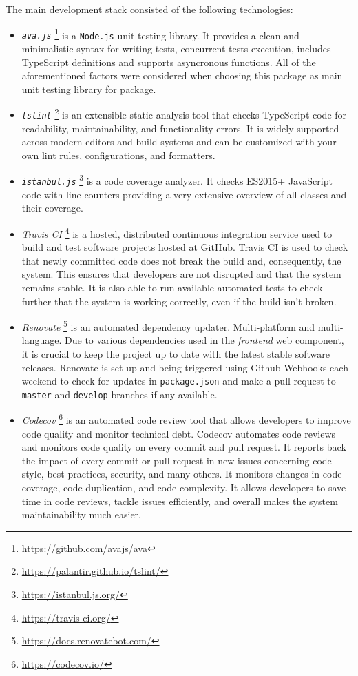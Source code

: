 The main development stack consisted of the following technologies: 
\begin{itemize}
    \item \textit{\texttt{ava.js}} \footnote{\url{https://github.com/avajs/ava}} is a \texttt{Node.js} unit testing library. It provides a clean and minimalistic syntax for writing tests, concurrent tests execution, includes TypeScript definitions and supports asyncronous functions. All of the aforementioned factors were considered when choosing this package as main unit testing library for \lpas{} package.
    
    \item \textit{\texttt{tslint}} \footnote{\url{https://palantir.github.io/tslint/}} is an extensible static analysis tool that checks TypeScript code for readability, maintainability, and functionality errors. It is widely supported across modern editors and build systems and can be customized with your own lint rules, configurations, and formatters.
    
    \item \textit{\texttt{istanbul.js}} \footnote{\url{https://istanbul.js.org/}} is a code coverage analyzer. It checks ES2015+ JavaScript code with line counters providing a very extensive overview of all classes and their coverage.
    
    \item \textit{Travis CI} \footnote{\url{https://travis-ci.org/}} is a hosted, distributed continuous integration service used to build and test software projects hosted at GitHub. Travis CI is used to check that newly committed code does not break the build and, consequently, the system. This ensures that developers are not disrupted and that the system remains stable. It is also able to run available automated tests to check further that the system is working correctly, even if the build isn't broken.

    \item \textit{Renovate} \footnote{\url{https://docs.renovatebot.com/}} is an automated dependency updater. Multi-platform and multi-language. Due to various dependencies used in the \emph{frontend} web component, it is crucial to keep the project up to date with the latest stable software releases. Renovate is set up and being triggered using Github Webhooks each weekend to check for updates in \texttt{package.json} and make a pull request to \texttt{master} and \texttt{develop} branches if any available.

    \item \textit{Codecov} \footnote{\url{https://codecov.io/}} is an automated code review tool that allows developers to improve code quality and monitor technical debt. Codecov automates code reviews and monitors code quality on every commit and pull request. It reports back the impact of every commit or pull request in new issues concerning code style, best practices, security, and many others. It monitors changes in code coverage, code duplication, and code complexity. It allows developers to save time in code reviews, tackle issues efficiently, and overall makes the system maintainability much easier.
    

\end{itemize}
